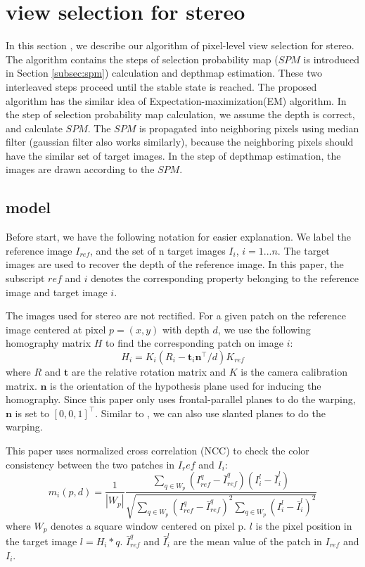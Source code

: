 \section{view selection for stereo} \label{sec:view_selection_stereo}

In this section , we describe our algorithm of pixel-level view selection for stereo. The algorithm contains the steps of selection probability map ($SPM$ is introduced in Section \ref{subsec:spm}) calculation and depthmap estimation. These two interleaved steps proceed until the stable state is reached. The proposed algorithm has the similar idea of Expectation-maximization(EM) algorithm. In the step of selection probability map calculation, we assume the depth is correct, and calculate $SPM$. The $SPM$ is propagated into neighboring pixels using median filter (gaussian filter also works similarly), because the neighboring pixels should have the similar set of target images. In the step of depthmap estimation, the images are drawn according to the $SPM$.

\subsection{model}
Before start, we have the following notation for easier explanation.  We label the reference image $I_{ref}$, and the set of n target images $I_i$, $i = 1...n$. The target images are used to recover the depth of the reference image. In this paper, the subscript $ref$ and $i$ denotes the corresponding property belonging to the reference image and target image $i$.

The images used for stereo are not rectified. For a given patch on the reference image centered at pixel $p = (x,y)$ with depth $d$, we use the following homography matrix $H$ to find the corresponding patch on image $i$:
\begin{equation}
H_i = K_i(R_i - \textbf{t}_i\textbf{n}^\intercal/d )K_{ref}
\end{equation}  \label{equ:homography}
where $R$ and $\textbf{t}$ are the relative rotation matrix and $K$ is the camera calibration matrix. $\textbf{n}$ is the orientation of the hypothesis plane used for inducing the homography. Since this paper only uses frontal-parallel planes to do the warping, $\textbf{n}$ is set to $[0,0,1]^\intercal$. Similar to \cite{patchMatchStereo1}\cite{patchMatchStereo2}, we can also use slanted planes to do the warping.

This paper uses normalized cross correlation (NCC) to check the color consistency between the two patches in $I_ref$ and $I_i$:
\begin{equation} 
    m_i(p,d) = \frac{1}{|W_p|} \frac{\sum\limits_{q\in{W_p}}{(I_{ref}^q - \bar{I}_{ref}^q)  (I_{i}^l - \bar{I}_{i}^l)}}
        {\sqrt{\sum\limits_{q\in{W_p}}{(I_{ref}^q - \bar{I}_{ref}^q)^2}  \sum\limits_{q\in{W_p}}{(I_{i}^l - \bar{I}_{i}^l)^2}    } }   \label{equ:ncc}
\end{equation}
where $W_p$ denotes a square window centered on pixel p. $l$ is the pixel position in the target image $l = H_i*q$. $\bar{I}_{ref}^q$ and $\bar{I}_{i}^l$ are the mean value of the patch in $I_{ref}$ and $I_i$. 

